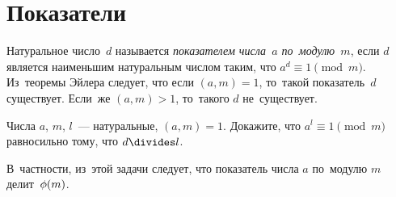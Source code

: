 
\section*{Показатели}


\begingroup \def\eulerphi{\mathrm{\phi}}

Натуральное число~$d$ называется \emph{показателем числа~$a$ по~модулю~$m$},
если $d$ является наименьшим натуральным числом таким, что
$a^d \equiv 1 \pmod{m}$.
Из~теоремы Эйлера следует, что если $(a, m) = 1$, то~такой показатель~$d$
существует.
Если~же $(a, m) > 1$, то~такого $d$ не~существует.

\begin{problems}

\item
Числа $a$, $m$, $l$~--- натуральные, $(a, m) = 1$.
Докажите, что $a^l \equiv 1 \pmod{m}$ равносильно тому, что $d \divides l$.

\end{problems}

В~частности, из~этой задачи следует, что показатель числа $a$ по~модулю $m$
делит~$\eulerphi(m)$.

